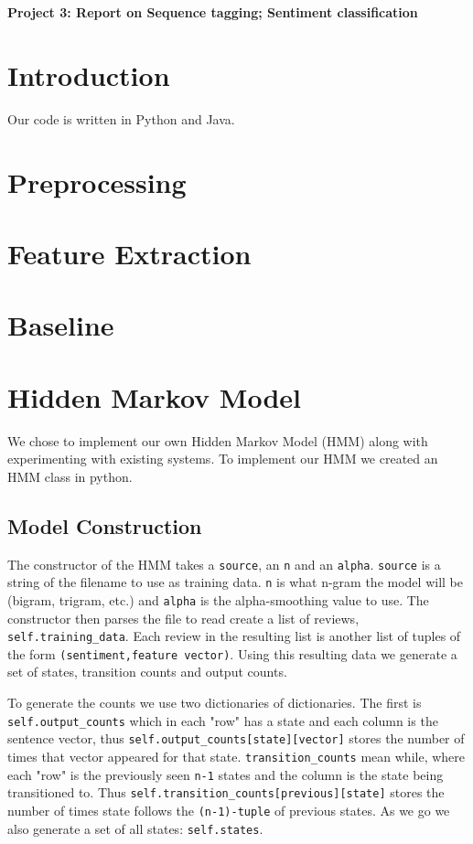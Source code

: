 \documentclass{article}
\begin{document}
\begin{center}\textbf{Project 3: Report on Sequence tagging; Sentiment classification}\end{center}

\section{Introduction}

Our code is written in Python and Java.

\section{Preprocessing}
\section{Feature Extraction}
\section{Baseline}
\section{Hidden Markov Model}

We chose to implement our own Hidden Markov Model (HMM) along with experimenting with existing systems. To implement our HMM we created an HMM class in python.

\subsection{Model Construction}
The constructor of the HMM takes a \texttt{source}, an \texttt{n} and an \texttt{alpha}. \texttt{source} is a string of the filename to use as training data. \texttt{n} is what n-gram the model will be (bigram, trigram, etc.) and \texttt{alpha} is the alpha-smoothing value to use. The constructor then parses the file to read create a list of reviews, \texttt{self.training\_data}. Each review in the resulting list is another list of tuples of the form \texttt{(sentiment,feature vector)}. Using this resulting data we generate a set of states, transition counts and output counts.

To generate the counts we use two dictionaries of dictionaries. The first is \texttt{self.output\_counts} which in each "row" has a state and each column is the sentence vector, thus \texttt{self.output\_counts[state][vector]} stores the number of times that vector appeared for that state. \texttt{transition\_counts} mean while, where each "row" is the previously seen \texttt{n-1} states and the column is the state being transitioned to. Thus \texttt{self.transition\_counts[previous][state]} stores the number of times state follows the \texttt{(n-1)-tuple} of previous states. As we go we also generate a set of all states: \texttt{self.states}.
\end{document}
